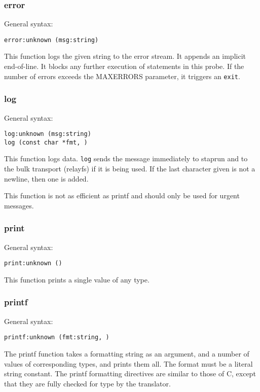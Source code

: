 \documentclass[twoside,english]{article}
\newenvironment{vindent}
{\begin{list}{}{\setlength{\listparindent}{6pt}}
\item[]}
{\end{list}}
\begin{document}
\subsubsection{error}
General syntax:

\begin{vindent}
\begin{verbatim}
error:unknown (msg:string)
\end{verbatim}
\end{vindent}
This function logs the given string to the error stream. It appends an implicit
end-of-line. It blocks any further execution of statements in this probe.
If the number of errors exceeds the MAXERRORS parameter, it triggers an \texttt{exit}.


\subsubsection{log}
General syntax:

\begin{vindent}
\begin{verbatim}
log:unknown (msg:string)
log (const char *fmt, )
\end{verbatim}
\end{vindent}
This function logs data. \texttt{log} sends the message immediately to staprun
and to the bulk transport (relayfs) if it is being used. If the last character
given is not a newline, then one is added.

This function is not as efficient as printf and should only be used for urgent
messages.

\subsubsection{print}
General syntax:

\begin{vindent}
\begin{verbatim}
print:unknown ()
\end{verbatim}
\end{vindent}
This function prints a single value of any type.


\subsubsection{printf}
General syntax:

\begin{vindent}
\begin{verbatim}
printf:unknown (fmt:string, )
\end{verbatim}
\end{vindent}
The printf function takes a formatting string as an argument, and a number
of values of corresponding types, and prints them all. The format must be a
literal string constant. The printf formatting directives are similar to those
of C, except that they are fully checked for type by the translator.
\end{document}
